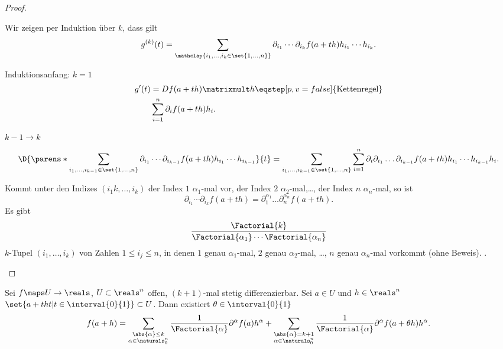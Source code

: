 \begin{proof}
  \begin{proofenumerate}
    \item Wir zeigen per Induktion über \( k \), dass gilt
    \begin{equation*}
      g^{(k)}(t)=\sum_{\mathclap{i_1,\dotsc,i_k\in \set{1,\dotsc,n}}}\partial_{i_1}\dotsb\partial_{i_k} f(a+th)h_{i_1}\dotsb h_{i_k}.
    \end{equation*}
    \begin{proofdescription}
      \item[Induktionsanfang: \( k=1 \)]
      \begin{align*}
        g'(t)&=Df(a+th)\matrixmult h\eqstep[p,v=false]{\text{Kettenregel}}\\
        &\sum_{i=1}^{n}\partial_i f(a+th) h_i.
      \end{align*}
      \item[\( k-1\to k \)]
      \begin{equation*}
        \D{\parens*{\sum_{i_1,\dotsc,i_{k-1}\in \set{1,\dotsc,n}}\partial_{i_1}\dotsb \partial_{i_{k-1}}f(a+th)h_{i_1}\dotsb h_{i_{k-1}}}}{t}=\sum_{i_1,\dotsc,i_{k-1}\in \set{1,\dots,n}} \sum_{i=1}^{n}\partial_i \partial_{i_1}\dotsc \partial_{i_{k-1}} f(a+th) h_{i_1}\dotsb h_{i_{k-1}}h_i.
      \end{equation*} 
    \end{proofdescription}
    \item Kommt unter den Indizes \( (i_1k,\dotsc,i_k) \) der Index \( 1 \) \( \alpha_1 \)-mal vor, der Index \( 2 \) \( \alpha_2 \)-mal,\dots, der Index \( n \) \( \alpha_n \)-mal, so ist 
    \begin{equation*}
      \partial_{i_1}\dotsb\partial_{i_k} f(a+th)=\partial_1^{\alpha_1}\dotsc \partial_n^{\alpha_n}f(a+th).
    \end{equation*}
    Es gibt 
    \begin{equation*}
      \frac{\Factorial{k}}{\Factorial{\alpha_1}\dotsb \Factorial{\alpha_n}}
    \end{equation*}
    \( k \)-Tupel \( (i_1,\dotsc,i_k) \) von Zahlen \( 1\leq i_j\leq n \), in denen \( 1 \) genau \( \alpha_1 \)-mal, \( 2 \) genau \( \alpha_2 \)-mal, \dots, \( n \) genau \( \alpha_n \)-mal vorkommt (ohne Beweis). \timplies \Beh.
  \end{proofenumerate}
\end{proof}
\begin{satz}
  Sei \( f\maps U\to \reals \), \( U\subset \reals^n \) offen, \( (k+1) \)-mal stetig differenzierbar. Sei \( a\in U \) und \( h\in \reals^n \) \sd \( \set{a+tht|t\in \interval{0}{1}}\subset U \). Dann existiert \( \theta\in \interval{0}{1} \) \sd
  \begin{equation*}
    f(a+h)=\sum_{\substack{\abs{\alpha}\leq k\\ \alpha\in \naturals_0^n}}\frac{1}{\Factorial{\alpha}} \partial^{\alpha} f(a) h^{\alpha} +\sum_{\substack{\abs{\alpha}=k+1\\ \alpha\in \naturals_0^{n}}} \frac{1}{\Factorial{\alpha}} \partial^{\alpha} f(a+\theta h) h^{\alpha}.
  \end{equation*}
\end{satz}
